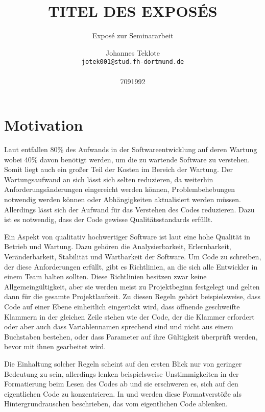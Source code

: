 \documentclass[fontsize=11pt, paper=a4, parskip=half]{scrartcl}
\title{
	TITEL DES EXPOSÉS
}
\subtitle{Exposé zur Seminararbeit}
\author{
	Johannes Teklote
	\\
	\texttt{jotek001@stud.fh-dortmund.de}
	\\ \\
	{7091992}
}
\begin{document}
\maketitle

\section{Motivation}
Laut \cite{Balzert2009} entfallen 80\% des Aufwands in der Softwareentwicklung auf deren Wartung wobei 40\% davon benötigt werden, um die zu wartende Software zu verstehen.
Somit liegt auch ein großer Teil der Kosten im Bereich der Wartung.
Der Wartungsaufwand an sich lässt sich selten reduzieren, da weiterhin Anforderungsänderungen eingereicht werden können, Problembehebungen notwendig werden können oder Abhängigkeiten aktualisiert werden müssen.
Allerdings lässt sich der Aufwand für das Verstehen des Codes reduzieren.
Dazu ist es notwendig, dass der Code gewisse Qualitätsstandards erfüllt.

Ein Aspekt von qualitativ hochwertiger Software ist laut \cite{ISO-25010} eine hohe Qualität in Betrieb und Wartung.
Dazu gehören die Analysierbarkeit, Erlernbarkeit, Veränderbarkeit, Stabilität und Wartbarkeit der Software.
Um Code zu schreiben, der diese Anforderungen erfüllt, gibt es Richtlinien, an die sich alle Entwickler in einem Team halten sollten.
Diese Richtlinien besitzen zwar keine Allgemeingültigkeit, aber sie werden meist zu Projektbeginn festgelegt und gelten dann für die gesamte Projektlaufzeit.
Zu diesen Regeln gehört beispielsweise, dass Code auf einer Ebene einheitlich eingerückt wird, dass öffnende geschweifte Klammern in der gleichen Zeile stehen wie der Code, der die Klammer erfordert oder aber auch dass Variablennamen sprechend sind und nicht aus einem Buchstaben bestehen, oder dass Parameter auf ihre Gültigkeit überprüft werden, bevor mit ihnen gearbeitet wird. 

Die Einhaltung solcher Regeln scheint auf den ersten Blick nur von geringer Bedeutung zu sein, allerdings lenken beispielsweise Unstimmigkeiten in der Formatierung beim Lesen des Codes ab und sie erschweren es, sich auf den eigentlichen Code zu konzentrieren.
In \cite{PJ2015} und \cite{SP2011} werden diese Formatverstöße als Hintergrundrauschen beschrieben, das vom eigentlichen Code ablenken. 
\end{document}
